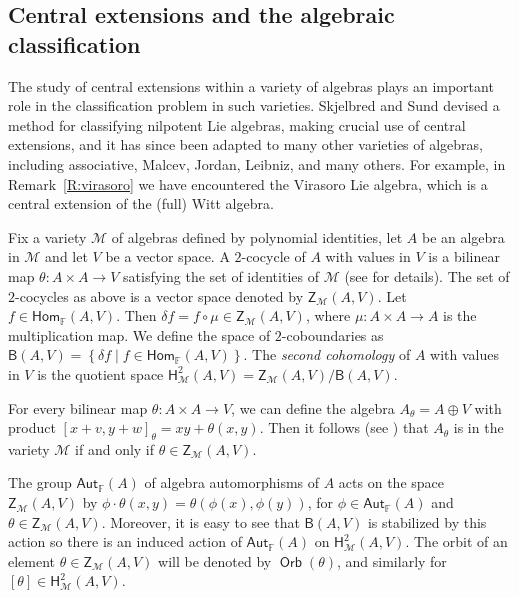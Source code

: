 \documentclass{commat}
\newcommand{\FF}{\mathbb{F}}
\newcommand\Hom{\mathsf{Hom}}
\newcommand\aut[1][\FF]{ \mathsf{Aut}_{#1}}
\newcommand{\pb}[1]{\left\{ #1\right\}}
\begin{document}
\subsection{Central extensions and the algebraic classification}\label{SS:naa:ce}

The study of central extensions within a variety of algebras plays an important role in the classification problem in such varieties. Skjelbred and Sund \cite{ss78} devised a method for classifying nilpotent Lie algebras, making crucial use of central extensions, and it has since been adapted to many other varieties of algebras, including associative, Malcev, Jordan, Leibniz, and many others. For example, in Remark~\ref{R:virasoro} we have encountered the Virasoro Lie algebra, which is a central extension of the (full) Witt algebra.

Fix a variety $\mathcal M$ of algebras defined by polynomial identities, let $A$ be an algebra in $\mathcal M$ and let $V$ be a vector space. A $2$-cocycle of $A$ with values in $V$ is a bilinear map $\theta\colon { A}\times { A}\longrightarrow { V}$ satisfying the set of identities of $\mathcal M$ (see \cite[Sec.\ 1]{KLP20} for details). The set of $2$-cocycles as above is a vector space denoted by $\mathsf{Z}_{{\mathcal M}}({ A},{ V})$. Let $f\in\Hom_\FF(A,V)$. Then $\delta f=f\circ\mu\in\mathsf{Z}_{{\mathcal M}}({ A},{ V})$, where $\mu:{ A}\times { A}\longrightarrow { A}$ is the multiplication map. We define the space of $2$-coboundaries as $\mathsf{B}  ({ A},{ V})=\pb{\delta f \mid  f\in\Hom_\FF(A,V) }$. The {\it second cohomology} of $A$ with values in $V$ is the quotient space $\mathsf{H}^2_{\mathcal M}({ A},{ V})=\mathsf{Z}_{{\mathcal M}}({ A},{ V})/\mathsf{B}  ({ A},{ V})$.

For every bilinear map $\theta\colon { A} \times { A} \longrightarrow { V}$, we can define the algebra ${ A}_{\theta}={ A}\oplus { V}$ with product $[x+v,y+w]_{\theta}=xy+\theta(x,y)$. Then it follows (see \cite[Lem.\ 1.1]{KLP20}) that ${ A}_{\theta}$ is in the variety ${\mathcal M}$ if and only if $\theta\in\mathsf{Z}_{\mathcal M}(A, V)$.

The group $\aut(A)$ of algebra automorphisms of $A$ acts on the space $\mathsf{Z}_{\mathcal M}(A, V)$ by $\phi\cdot\theta(x,y)=\theta (\phi(x),\phi(y))$, for $\phi\in\aut(A)$ and $\theta\in\mathsf{Z}_{\mathcal M}(A, V)$. Moreover, it is easy to see that $\mathsf{B}  ({ A},{ V})$ is stabilized by this action so there is an induced action of $\aut(A)$ on $\mathsf{H}^2_{\mathcal M}({ A},{ V})$. The orbit of an element $\theta\in \mathsf{Z}_{\mathcal M}(A, V)$ will be denoted by $\operatorname{\mathsf{Orb}}(\theta)$, and similarly for $[\theta]\in\mathsf{H}^2_{\mathcal M}({ A},{ V})$.
\end{document}
